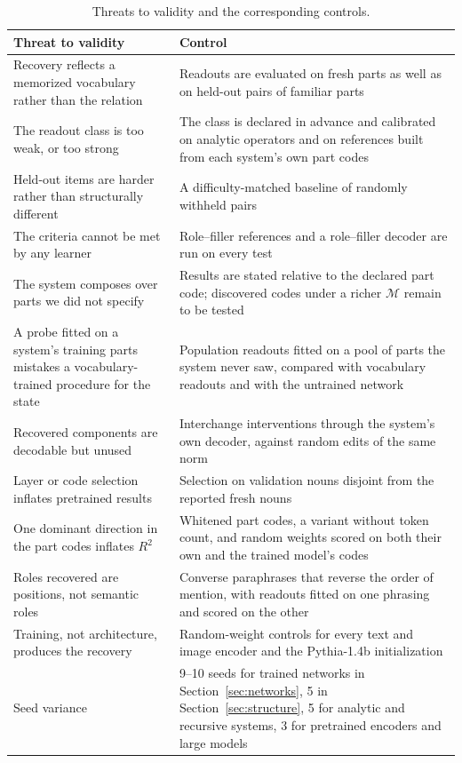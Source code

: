 \documentclass[10pt]{article}
\theoremstyle{plain}
\theoremstyle{remark}
\newcommand{\M}{\mathcal{M}}
\begin{document}
\begin{table}[h]
  \caption{Threats to validity and the corresponding controls.}
  \label{tab:controls}
  \centering\small
  \begin{tabularx}{\linewidth}{@{}YY@{}}
    \toprule
    Threat to validity & Control \\
    \midrule
    Recovery reflects a memorized vocabulary rather than the relation & Readouts are evaluated on fresh parts as well as on held-out pairs of familiar parts \\
    The readout class is too weak, or too strong & The class is declared in advance and calibrated on analytic operators and on references built from each system's own part codes \\
    Held-out items are harder rather than structurally different & A difficulty-matched baseline of randomly withheld pairs \\
    The criteria cannot be met by any learner & Role--filler references and a role--filler decoder are run on every test \\
    The system composes over parts we did not specify & Results are stated relative to the declared part code; discovered codes under a richer $\M$ remain to be tested \\
    A probe fitted on a system's training parts mistakes a vocabulary-trained procedure for the state & Population readouts fitted on a pool of parts the system never saw, compared with vocabulary readouts and with the untrained network \\
    Recovered components are decodable but unused & Interchange interventions through the system's own decoder, against random edits of the same norm \\
    Layer or code selection inflates pretrained results & Selection on validation nouns disjoint from the reported fresh nouns \\
    One dominant direction in the part codes inflates $R^2$ & Whitened part codes, a variant without token count, and random weights scored on both their own and the trained model's codes \\
    Roles recovered are positions, not semantic roles & Converse paraphrases that reverse the order of mention, with readouts fitted on one phrasing and scored on the other \\
    Training, not architecture, produces the recovery & Random-weight controls for every text and image encoder and the Pythia-1.4b initialization \\
    Seed variance & 9--10 seeds for trained networks in Section~\ref{sec:networks}, 5 in Section~\ref{sec:structure}, 5 for analytic and recursive systems, 3 for pretrained encoders and large models \\
    \bottomrule
  \end{tabularx}
\end{table}
\end{document}
